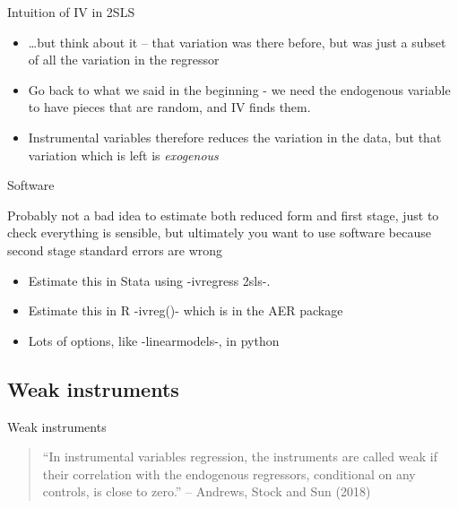 \documentclass{beamer}
\begin{document}
\begin{frame}{Intuition of IV in 2SLS}

\begin{itemize}
	\item \dots but think about it -- that variation was there before, but was just a subset of all the variation in the regressor
	\item Go back to what we said in the beginning - we need the endogenous variable to have pieces that are random, and IV finds them.
	\item Instrumental variables therefore reduces the variation in the data, but that variation which is left is 
\emph{exogenous}
\end{itemize}

\end{frame}
	



\begin{frame}{Software}



Probably not a bad idea to estimate both reduced form and first stage, just to check everything is sensible, but ultimately you want to use software because second stage standard errors are wrong

\bigskip

\begin{itemize}
	\item Estimate this in Stata using -ivregress 2sls-.
	\item Estimate this in R -ivreg()- which is in the AER package
	\item Lots of options, like -linearmodels-, in python

\end{itemize}

\end{frame}



\subsection{Weak instruments}

\begin{frame}{Weak instruments}

\begin{quote}
``In instrumental variables regression, the instruments are called weak if their correlation with the endogenous regressors, conditional on any controls, is close to zero.'' -- Andrews, Stock and Sun (2018)
\end{quote}

\end{frame}
\end{document}

